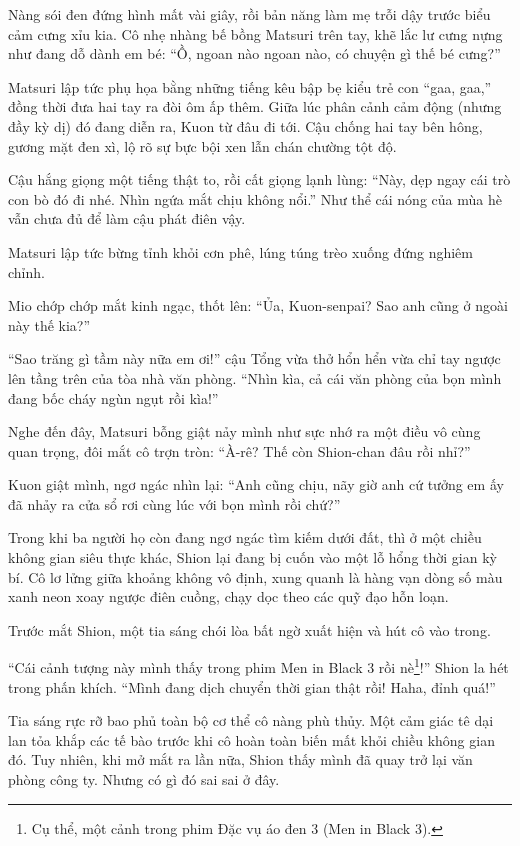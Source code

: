 \documentclass[../main.tex]{subfiles}
\begin{document}
Nàng sói đen đứng hình mất vài giây, rồi bản năng làm mẹ trỗi dậy trước biểu cảm cưng xỉu kia. Cô nhẹ nhàng bế bồng Matsuri trên tay, khẽ lắc lư cưng nựng như đang dỗ dành em bé: ``Ồ, ngoan nào ngoan nào, có chuyện gì thế bé cưng?''

Matsuri lập tức phụ họa bằng những tiếng kêu bập bẹ kiểu trẻ con ``gaa, gaa,'' đồng thời đưa hai tay ra đòi ôm ấp thêm. Giữa lúc phân cảnh cảm động (nhưng đầy kỳ dị) đó đang diễn ra, Kuon từ đâu đi tới. Cậu chống hai tay bên hông, gương mặt đen xì, lộ rõ sự bực bội xen lẫn chán chường tột độ.

Cậu hắng giọng một tiếng thật to, rồi cất giọng lạnh lùng: ``Này, dẹp ngay cái trò con bò đó đi nhé. Nhìn ngứa mắt chịu không nổi.'' Như thể cái nóng của mùa hè vẫn chưa đủ để làm cậu phát điên vậy.

Matsuri lập tức bừng tỉnh khỏi cơn phê, lúng túng trèo xuống đứng nghiêm chỉnh.

Mio chớp chớp mắt kinh ngạc, thốt lên: ``Ủa, Kuon-senpai? Sao anh cũng ở ngoài này thế kia?''

``Sao trăng gì tầm này nữa em ơi!'' cậu Tổng vừa thở hổn hển vừa chỉ tay ngược lên tầng trên của tòa nhà văn phòng. ``Nhìn kìa, cả cái văn phòng của bọn mình đang bốc cháy ngùn ngụt rồi kìa!''

Nghe đến đây, Matsuri bỗng giật nảy mình như sực nhớ ra một điều vô cùng quan trọng, đôi mắt cô trợn tròn: ``À-rê? Thế còn Shion-chan đâu rồi nhỉ?''

Kuon giật mình, ngơ ngác nhìn lại: ``Anh cũng chịu, nãy giờ anh cứ tưởng em ấy đã nhảy ra cửa sổ rơi cùng lúc với bọn mình rồi chứ?''

Trong khi ba người họ còn đang ngơ ngác tìm kiếm dưới đất, thì ở một chiều không gian siêu thực khác, Shion lại đang bị cuốn vào một lỗ hổng thời gian kỳ bí. Cô lơ lửng giữa khoảng không vô định, xung quanh là hàng vạn dòng số màu xanh neon xoay ngược điên cuồng, chạy dọc theo các quỹ đạo hỗn loạn.


Trước mắt Shion, một tia sáng chói lòa bất ngờ xuất hiện và hút cô vào trong.

``Cái cảnh tượng này mình thấy trong phim Men in Black 3 rồi nè\footnote{Cụ thể, một cảnh trong phim Đặc vụ áo đen 3 (Men in Black 3).}!'' Shion la hét trong phấn khích. ``Mình đang dịch chuyển thời gian thật rồi! Haha, đỉnh quá!''

Tia sáng rực rỡ bao phủ toàn bộ cơ thể cô nàng phù thủy. Một cảm giác tê dại lan tỏa khắp các tế bào trước khi cô hoàn toàn biến mất khỏi chiều không gian đó. Tuy nhiên, khi mở mắt ra lần nữa, Shion thấy mình đã quay trở lại văn phòng công ty. Nhưng có gì đó sai sai ở đây.
\end{document}
